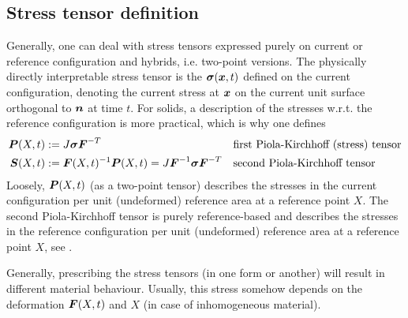 \subsection{Stress tensor definition}
Generally, one can deal with stress tensors expressed purely on current or reference configuration and hybrids, i.e. two-point versions.
The physically directly interpretable stress tensor is the  $\boldsymbol{\sigma}(\boldsymbol{x},t)$ defined on the current configuration,
denoting the current stress at $\boldsymbol{x}$ on the current unit surface orthogonal to $\boldsymbol{n}$ at time $t$.
For solids, a description of the stresses w.r.t. the reference configuration is more practical, which is why one defines
\begin{align}
	\boldsymbol{P}(X,t) &:= J\boldsymbol{\sigma}\boldsymbol{F}^{-T} &&\text{first Piola-Kirchhoff (stress) tensor}\\
	\boldsymbol{S}(X,t) &:= \boldsymbol{F}(X,t)^{-1}\boldsymbol{P}(X,t) = J\boldsymbol{F}^{-1}\boldsymbol{\sigma}\boldsymbol{F}^{-T} && \text{second Piola-Kirchhoff tensor} \label{def:secondpiola}
\end{align}
Loosely, $\boldsymbol{P}(X,t)$ (as a two-point tensor) describes the stresses in the current configuration per unit (undeformed) reference area at a reference point $X$.
The second Piola-Kirchhoff tensor is purely reference-based and describes the stresses in the reference configuration
per unit (undeformed) reference area at a reference point $X$, see \cite[p. 145ff]{Bonet2008}.

Generally, prescribing the stress tensors (in one form or another) will result in different material behaviour.
Usually, this stress somehow depends on the deformation $\boldsymbol{F}(X,t)$ and $X$ (in case of inhomogeneous material).

